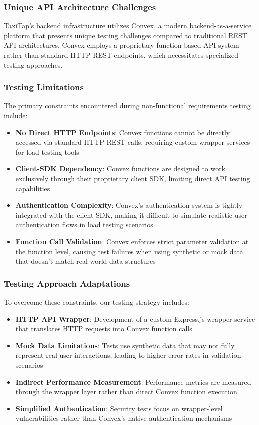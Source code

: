 \documentclass[a4paper,12pt]{article}
\begin{document}
\subsubsection{Unique API Architecture Challenges}
TaxiTap's backend infrastructure utilizes Convex, a modern backend-as-a-service platform that presents unique testing challenges compared to traditional REST API architectures. Convex employs a proprietary function-based API system rather than standard HTTP REST endpoints, which necessitates specialized testing approaches.

\subsubsection{Testing Limitations}
The primary constraints encountered during non-functional requirements testing include:

\begin{itemize}
    \item \textbf{No Direct HTTP Endpoints}: Convex functions cannot be directly accessed via standard HTTP REST calls, requiring custom wrapper services for load testing tools
    \item \textbf{Client-SDK Dependency}: Convex functions are designed to work exclusively through their proprietary client SDK, limiting direct API testing capabilities
    \item \textbf{Authentication Complexity}: Convex's authentication system is tightly integrated with the client SDK, making it difficult to simulate realistic user authentication flows in load testing scenarios
    \item \textbf{Function Call Validation}: Convex enforces strict parameter validation at the function level, causing test failures when using synthetic or mock data that doesn't match real-world data structures
\end{itemize}

\subsubsection{Testing Approach Adaptations}
To overcome these constraints, our testing strategy includes:

\begin{itemize}
    \item \textbf{HTTP API Wrapper}: Development of a custom Express.js wrapper service that translates HTTP requests into Convex function calls
    \item \textbf{Mock Data Limitations}: Tests use synthetic data that may not fully represent real user interactions, leading to higher error rates in validation scenarios
    \item \textbf{Indirect Performance Measurement}: Performance metrics are measured through the wrapper layer rather than direct Convex function execution
    \item \textbf{Simplified Authentication}: Security tests focus on wrapper-level vulnerabilities rather than Convex's native authentication mechanisms
\end{itemize}
\end{document}
